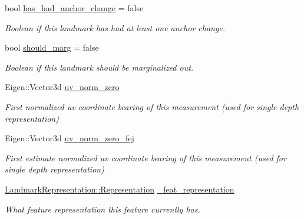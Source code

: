 \begin{DoxyCompactItemize}
bool \hyperlink{classov__type_1_1Landmark_a8c2faa8e153b95606c9062527fdd029e}{has\+\_\+had\+\_\+anchor\+\_\+change} = false
\begin{DoxyCompactList}\small\item\em Boolean if this landmark has had at least one anchor change. \end{DoxyCompactList}\item 
\mbox{\label{classov__type_1_1Landmark_af1020195008ececef0aceec655af7b66}} 
bool \hyperlink{classov__type_1_1Landmark_af1020195008ececef0aceec655af7b66}{should\+\_\+marg} = false
\begin{DoxyCompactList}\small\item\em Boolean if this landmark should be marginalized out. \end{DoxyCompactList}\item 
\mbox{\label{classov__type_1_1Landmark_a91175b33f67648b4613a4e8fbf45c57b}} 
Eigen\+::\+Vector3d \hyperlink{classov__type_1_1Landmark_a91175b33f67648b4613a4e8fbf45c57b}{uv\+\_\+norm\+\_\+zero}
\begin{DoxyCompactList}\small\item\em First normalized uv coordinate bearing of this measurement (used for single depth representation) \end{DoxyCompactList}\item 
\mbox{\label{classov__type_1_1Landmark_a1ec99a64bd719ecde264279aa7e45b5f}} 
Eigen\+::\+Vector3d \hyperlink{classov__type_1_1Landmark_a1ec99a64bd719ecde264279aa7e45b5f}{uv\+\_\+norm\+\_\+zero\+\_\+fej}
\begin{DoxyCompactList}\small\item\em First estimate normalized uv coordinate bearing of this measurement (used for single depth representation) \end{DoxyCompactList}\item 
\mbox{\label{classov__type_1_1Landmark_a0935ff64bd9d96b24e8437c96a6bbe3d}} 
\hyperlink{classov__type_1_1LandmarkRepresentation_a7f5783df6932ace7f098ae243b6d298e}{Landmark\+Representation\+::\+Representation} \hyperlink{classov__type_1_1Landmark_a0935ff64bd9d96b24e8437c96a6bbe3d}{\+\_\+feat\+\_\+representation}
\begin{DoxyCompactList}\small\item\em What feature representation this feature currently has. \end{DoxyCompactList}\end{DoxyCompactItemize}
